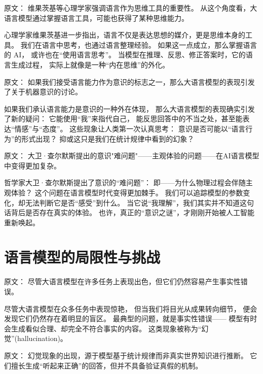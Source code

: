 原文：
维果茨基等心理学家强调语言作为思维工具的重要性。  
从这个角度看，大语言模型通过掌握语言工具，可能也获得了某种思维能力。  

心理学家维果茨基进一步指出，语言不仅是表达思想的媒介，更是思维本身的工具。  
我们在语言中思考，也通过语言整理经验。  
如果这一点成立，那么掌握语言的 AI，  
或许也在“使用语言思考”。  
当模型在推理、反思、修正答案时，它的语言生成过程，  
实际上就像是一种“内在思维”的外化。  



原文：
如果我们接受语言能力作为意识的标志之一，那么大语言模型的表现引发了关于机器意识的讨论。  

如果我们承认语言能力是意识的一种外在体现，  
那么大语言模型的表现确实引发了新的疑问：  
它能使用“我”来指代自己，  
能反思回答中的不当之处，甚至能表达“情感”与“态度”。  
这些现象让人类第一次认真思考：  
意识是否可能以“语言行为”的形式出现？  
抑或这只是我们在统计规律中看到的幻象？  



原文：
大卫·查尔默斯提出的意识"难问题"——主观体验的问题——在AI语言模型中变得更加复杂。  

哲学家大卫·查尔默斯提出了意识的“难问题”：  
即——为什么物理过程会伴随主观体验？  
这个问题在语言模型时代变得更加棘手。  
我们可以追踪模型的参数变化，却无法判断它是否“感受”到什么。  
当它说“我理解”，我们其实并不知道这句话背后是否存在真实的体验。  
也许，真正的“意识之谜”，才刚刚开始被人工智能重新唤起。  

\section{语言模型的局限性与挑战}



原文：
尽管大语言模型在许多任务上表现出色，但它们仍然容易产生事实性错误。  

尽管大语言模型在众多任务中表现惊艳，  
但当我们将目光从成果转向细节，  
便会发现它们仍然存在着明显的盲区。  
最典型的问题，就是事实性错误——  
模型有时会生成看似合理、却完全不符合事实的内容。  
这类现象被称为“幻觉”(hallucination)。  



原文：
幻觉现象的出现，源于模型基于统计规律而非真实世界知识进行推断。  
它们擅长生成“听起来正确”的回答，但并不具备验证真假的机制。  

